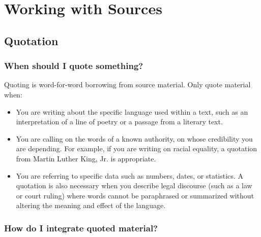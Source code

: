 

\chapter{Working with Sources}
\section{Quotation}
 
\subsection{When should I quote something?}

Quoting is word-for-word borrowing from source material. Only quote material when:
 
\begin{itemize}

\item You are writing about the specific language used within a text, such as an 
interpretation of a line of poetry or a passage from a literary text.
 
\item You are calling on the words of a known authority, on whose credibility you are 
depending. For example, if you are writing on racial equality, a quotation from Martin
Luther King, Jr. is appropriate.
 
\item You are referring to specific data such as numbers, dates, or statistics. A quotation
is also necessary when you describe legal discourse (such as a law or court ruling) where words cannot be
paraphrased or summarized without altering the meaning and effect of the language.
 
\end{itemize}
 
\subsection{How do I integrate quoted material?}
 
